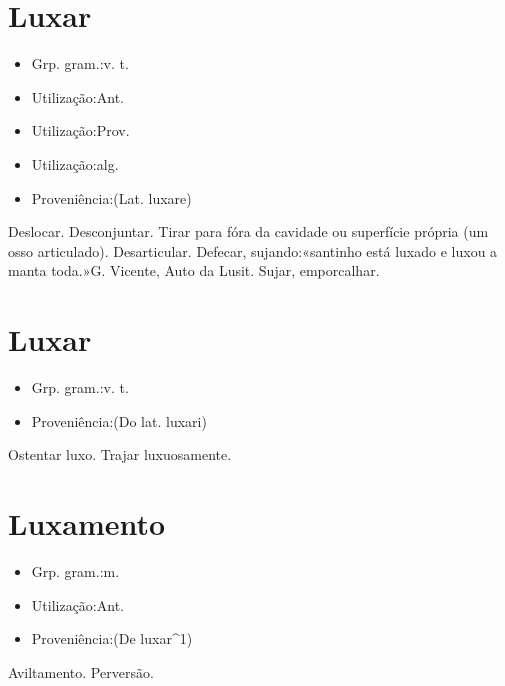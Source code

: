 \section{Luxar}
\begin{itemize}
\item {Grp. gram.:v. t.}
\end{itemize}
\begin{itemize}
\item {Utilização:Ant.}
\end{itemize}
\begin{itemize}
\item {Utilização:Prov.}
\end{itemize}
\begin{itemize}
\item {Utilização:alg.}
\end{itemize}
\begin{itemize}
\item {Proveniência:(Lat. \textunderscore luxare\textunderscore )}
\end{itemize}
Deslocar.
Desconjuntar.
Tirar para fóra da cavidade ou superfície própria (um osso articulado).
Desarticular.
Defecar, sujando:«\textunderscore santinho está luxado e luxou a manta toda.\textunderscore »G. Vicente, \textunderscore Auto da Lusit.\textunderscore 
Sujar, emporcalhar.
\section{Luxar}
\begin{itemize}
\item {Grp. gram.:v. t.}
\end{itemize}
\begin{itemize}
\item {Proveniência:(Do lat. \textunderscore luxari\textunderscore )}
\end{itemize}
Ostentar luxo.
Trajar luxuosamente.
\section{Luxamento}
\begin{itemize}
\item {Grp. gram.:m.}
\end{itemize}
\begin{itemize}
\item {Utilização:Ant.}
\end{itemize}
\begin{itemize}
\item {Proveniência:(De \textunderscore luxar\textunderscore ^1)}
\end{itemize}
Aviltamento.
Perversão.
